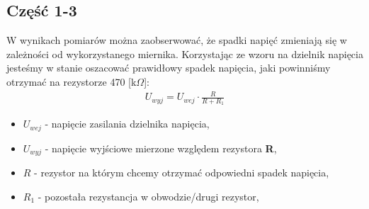 \documentclass[11pt]{article}
\begin{document}
    \subsection*{Część 1-3}
    W wynikach pomiarów można zaobserwować, że spadki napięć
    zmieniają się w zależności od wykorzystanego miernika.
    Korzystając ze wzoru na dzielnik napięcia jesteśmy w stanie
    oszacować prawidłowy spadek napięcia, jaki powinniśmy otrzymać na rezystorze 470 [k$\Omega$]:
    \begin{gather*}
        U_{wyj}=U_{wej}\cdot \frac{R}{R+R_1}
    \end{gather*}
    {\footnotesize
        \begin{itemize}
            \setlength\itemsep{0em}
            \item[] \boldmath$U_{wej}$ - napięcie zasilania dzielnika napięcia,
            \item[] \boldmath$U_{wyj}$ - napięcie wyjściowe mierzone względem rezystora \textbf{R},
            \item[] \boldmath$R$ - rezystor na którym chcemy otrzymać odpowiedni spadek napięcia,
            \item[] \boldmath$R_1$ - pozostała rezystancja w obwodzie/drugi rezystor,
        \end{itemize}}
\end{document}
